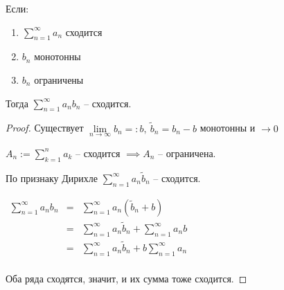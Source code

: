 \begin{theorem} \thmslashn 

    Если: 
    
    \begin{enumerate}
        \item $\sum\limits_{n=1}^{\infty} a_n$ сходится
        \item $b_n$ монотонны
        \item $b_n$ ограничены
    \end{enumerate}

	Тогда $\sum\limits_{n=1}^{\infty} a_nb_n$ -- сходится.
	
	\begin{proof} \thmslashn
	
	    Существует $\lim\limits_{n \to \infty} b_n =: b, ~ \widetilde{b}_n = b_n - b$ монотонны и $\to 0$
	    
	    $A_n := \sum\limits_{k=1}^{n} a_k$ -- сходится $\implies A_n$ -- ограничена.
	    
	    По признаку Дирихле $\sum\limits_{n=1}^{\infty} a_n\widetilde{b}_n$ -- сходится.
	    
	    $\begin{array}{rcll}
    	\sum\limits_{n=1}^{\infty} a_nb_n &=& \sum\limits_{n=1}^{\infty} a_n(\widetilde{b}_n + b) \\
    	                             &=& \sum\limits_{n=1}^{\infty} a_n\widetilde{b}_n + \sum\limits_{n=1}^{\infty} a_nb \\
    	                             &=& \sum\limits_{n=1}^{\infty} a_n\widetilde{b}_n + b\sum\limits_{n=1}^{\infty} a_n \\
    	\end{array}$
	    
	    Оба ряда сходятся, значит, и их сумма тоже сходится.
	   
    \end{proof}

\end{theorem}
